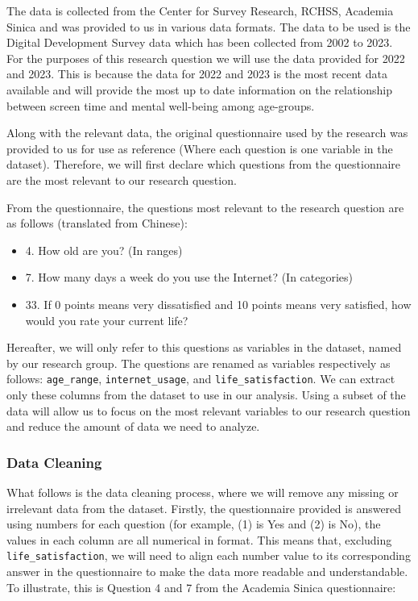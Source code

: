 \documentclass[12pt, a4paper]{article}
\begin{document}
\par The data is collected from the Center for Survey Research, RCHSS, Academia Sinica and was provided to us in various data formats. The data to be used is the Digital Development Survey data which has been collected from 2002 to 2023.
For the purposes of this research question we will use the data provided for 2022 and 2023. This is because the data for 2022 and 2023 is the most recent data available and will provide the most up to date information on the relationship between screen time and mental well-being among age-groups.
\par Along with the relevant data, the original questionnaire used by the research was provided to us for use as reference (Where each question is one variable in the dataset). Therefore, we will first declare which questions from the questionnaire are the most relevant to our research question.
\par From the questionnaire, the questions most relevant to the research question are as follows (translated from Chinese):
\begin{itemize}
    \item 4. How old are you? {\footnotesize(In ranges)}
    \item 7. How  many  days  a  week  do  you  use  the  Internet? {\footnotesize(In categories)}
    \item 33.  If  0  points  means  very  dissatisfied  and  10  points  means  very  satisfied,  how  would  you  rate  your  current  life?
\end{itemize}
\par Hereafter, we will only refer to this questions as variables in the dataset, named by our research group.
The questions are renamed as variables respectively as follows: \texttt{age\_range}, \texttt{internet\_usage}, and \texttt{life\_satisfaction}.
We can extract only these columns from the dataset to use in our analysis. Using a subset of the data will allow us to focus on the most relevant variables to our research question and reduce the amount of data we need to analyze.

\subsubsection{Data Cleaning}

\par What follows is the data cleaning process, where we will remove any missing or irrelevant data from the dataset.
Firstly, the questionnaire provided is answered using numbers for each question (for example, (1) is Yes and (2) is No), the values in each column are all numerical in format.
This means that, excluding \texttt{life\_satisfaction}, we will need to align each number value to its corresponding answer in the questionnaire to make the data more readable and understandable.
To illustrate, this is Question 4 and 7 from the Academia Sinica questionnaire:
\end{document}

